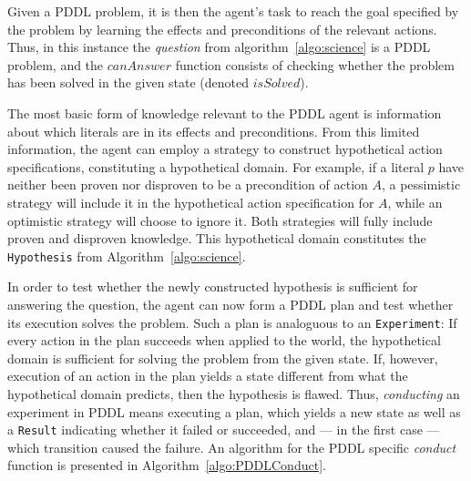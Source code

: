 \documentclass[../Master.tex]{subfiles}
\begin{document}
%
%



Given a PDDL problem, it is then the agent's task to reach the goal specified by the problem by learning the effects and preconditions of the relevant actions. Thus, in this instance the \textit{question} from algorithm~\ref{algo:science} is a PDDL problem, and the $canAnswer$ function consists of checking whether the problem has been solved in the given state (denoted $isSolved$).

The most basic form of knowledge relevant to the PDDL agent is information about which literals are in its effects and preconditions. From this limited information, the agent can employ a strategy to construct hypothetical action specifications, constituting a hypothetical domain. For example, if a literal $p$ have neither been proven nor disproven to be a precondition of action $A$, a pessimistic strategy will include it in the hypothetical action specification for $A$, while an optimistic strategy will choose to ignore it. Both strategies will fully include proven and disproven knowledge. This hypothetical domain constitutes the \texttt{Hypothesis} from Algorithm~\ref{algo:science}.

In order to test whether the newly constructed hypothesis is sufficient for answering the question, the agent can now form a PDDL plan and test whether its execution solves the problem. Such a plan is analoguous to an \texttt{Experiment}: If every action in the plan succeeds when applied to the world, the hypothetical domain is sufficient for solving the problem from the given state. If, however, execution of an action in the plan yields a state different from what the hypothetical domain predicts, then the hypothesis is flawed. Thus, \emph{conducting} an experiment in PDDL means executing a plan, which yields a new state as well as a \texttt{Result} indicating whether it failed or succeeded, and --- in the first case --- which transition caused the failure. An algorithm for the PDDL specific \textit{conduct} function is presented in Algorithm~\ref{algo:PDDLConduct}. 
\end{document}
